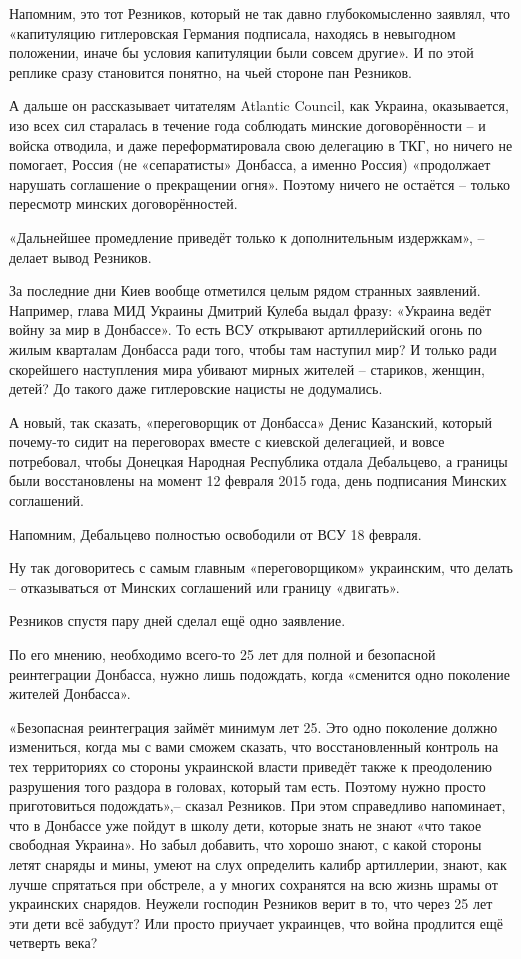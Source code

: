 Напомним, это тот Резников, который не так давно глубокомысленно заявлял, что
«капитуляцию гитлеровская Германия подписала, находясь в невыгодном положении,
иначе бы условия капитуляции были совсем другие». И по этой реплике сразу
становится понятно, на чьей стороне пан Резников.

А дальше он рассказывает читателям Atlantic Council, как Украина, оказывается,
изо всех сил старалась в течение года соблюдать минские договорённости – и
войска отводила, и даже переформатировала свою делегацию в ТКГ, но ничего не
помогает, Россия (не «сепаратисты» Донбасса, а именно Россия) «продолжает
нарушать соглашение о прекращении огня». Поэтому ничего не остаётся – только
пересмотр минских договорённостей.

«Дальнейшее промедление приведёт только к дополнительным издержкам», – делает
вывод Резников.

За последние дни Киев вообще отметился целым рядом странных заявлений.
Например, глава МИД Украины Дмитрий Кулеба выдал фразу: «Украина ведёт войну за
мир в Донбассе». То есть ВСУ открывают артиллерийский огонь по жилым кварталам
Донбасса ради того, чтобы там наступил мир? И только ради скорейшего
наступления мира убивают мирных жителей – стариков, женщин, детей? До такого
даже гитлеровские нацисты не додумались.

А новый, так сказать, «переговорщик от Донбасса» Денис Казанский, который
почему-то сидит на переговорах вместе с киевской делегацией, и вовсе
потребовал, чтобы Донецкая Народная Республика отдала Дебальцево, а границы
были восстановлены на момент 12 февраля 2015 года, день подписания Минских
соглашений.

Напомним, Дебальцево полностью освободили от ВСУ 18 февраля.

Ну так договоритесь с самым главным «переговорщиком» украинским, что делать –
отказываться от Минских соглашений или границу «двигать».

Резников спустя пару дней сделал ещё одно заявление.

По его мнению, необходимо всего-то 25 лет для полной и безопасной реинтеграции
Донбасса, нужно лишь подождать, когда «сменится одно поколение жителей
Донбасса».

«Безопасная реинтеграция займёт минимум лет 25. Это одно поколение должно
измениться, когда мы с вами сможем сказать, что восстановленный контроль на тех
территориях со стороны украинской власти приведёт также к преодолению
разрушения того раздора в головах, который там есть. Поэтому нужно просто
приготовиться подождать»,– сказал Резников. При этом справедливо напоминает,
что в Донбассе уже пойдут в школу дети, которые знать не знают «что такое
свободная Украина». Но забыл добавить, что хорошо знают, с какой стороны летят
снаряды и мины, умеют на слух определить калибр артиллерии, знают, как лучше
спрятаться при обстреле, а у многих сохранятся на всю жизнь шрамы от украинских
снарядов. Неужели господин Резников верит в то, что через 25 лет эти дети всё
забудут? Или просто приучает украинцев, что война продлится ещё четверть века?


